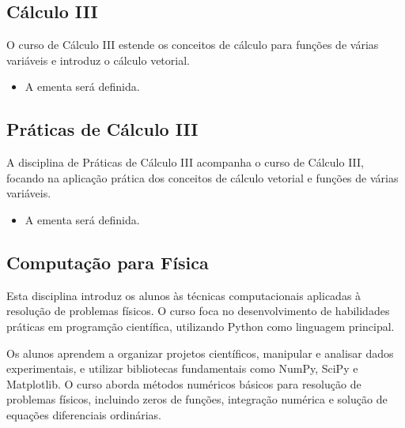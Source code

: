 \documentclass[a4paper, 12pt]{article}
\newcounter{fis}
\newcounter{mat}
\begin{document}
\subsection{Cálculo III}
\label{mat006}

O curso de Cálculo III estende os conceitos de cálculo para funções de várias
variáveis e introduz o cálculo vetorial.

\begin{tcolorbox}[title=Ementa:]
    \begin{itemize}
        \item A ementa será definida.
    \end{itemize}
\end{tcolorbox}

\subsection{Práticas de Cálculo III}
\label{mat007}

A disciplina de Práticas de Cálculo III acompanha o curso de Cálculo III, focando na
aplicação prática dos conceitos de cálculo vetorial e funções de várias variáveis.

\begin{tcolorbox}[title=Ementa:]
    \begin{itemize}
        \item A ementa será definida.
    \end{itemize}
\end{tcolorbox}

\subsection{Computação para Física}
\label{fis007}

Esta disciplina introduz os alunos às técnicas computacionais aplicadas à resolução de
problemas físicos. O curso foca no desenvolvimento de habilidades práticas em
programção científica, utilizando Python como linguagem principal.

Os alunos aprendem a organizar projetos científicos, manipular e analisar dados
experimentais, e utilizar bibliotecas fundamentais como NumPy, SciPy e Matplotlib. O
curso aborda métodos numéricos básicos para resolução de problemas físicos, incluindo
zeros de funções, integração numérica e solução de equações diferenciais ordinárias.
\end{document}
